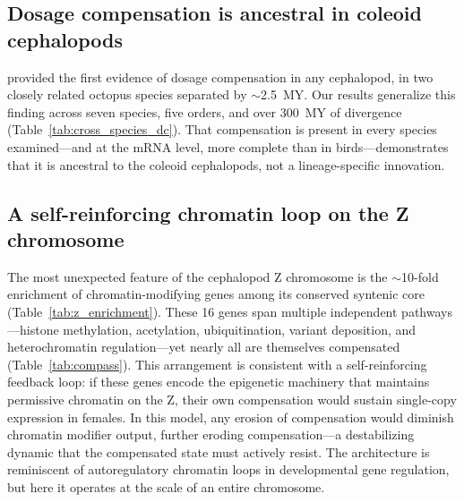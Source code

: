 \documentclass[12pt]{article}
\begin{document}

\subsection*{Dosage compensation is ancestral in coleoid cephalopods}

\textcite{papanicolaou2024z} provided the first evidence of dosage compensation
in any cephalopod, in two closely related octopus species separated by $\sim$2.5~MY.
Our results generalize this finding across seven species,
five orders, and over 300~MY of divergence
(Table~\ref{tab:cross_species_dc}).
That compensation is present in every species examined---and
at the mRNA level, more complete than in birds---demonstrates
that it is ancestral to the coleoid cephalopods,
not a lineage-specific innovation.

\subsection*{A self-reinforcing chromatin loop on the Z chromosome}

The most unexpected feature of the cephalopod Z chromosome
is the $\sim$10-fold enrichment of chromatin-modifying genes
among its conserved syntenic core (Table~\ref{tab:z_enrichment}).
These 16 genes span multiple independent pathways---histone methylation,
acetylation, ubiquitination, variant deposition, and heterochromatin regulation---yet
nearly all are themselves compensated (Table~\ref{tab:compass}).
This arrangement is consistent with a self-reinforcing feedback loop:
if these genes encode the epigenetic machinery
that maintains permissive chromatin on the Z,
their own compensation would sustain single-copy expression in females.
In this model, any erosion of compensation would diminish chromatin modifier output,
further eroding compensation---a destabilizing dynamic
that the compensated state must actively resist.
The architecture is reminiscent of autoregulatory chromatin loops
in developmental gene regulation,
but here it operates at the scale of an entire chromosome.
\end{document}
